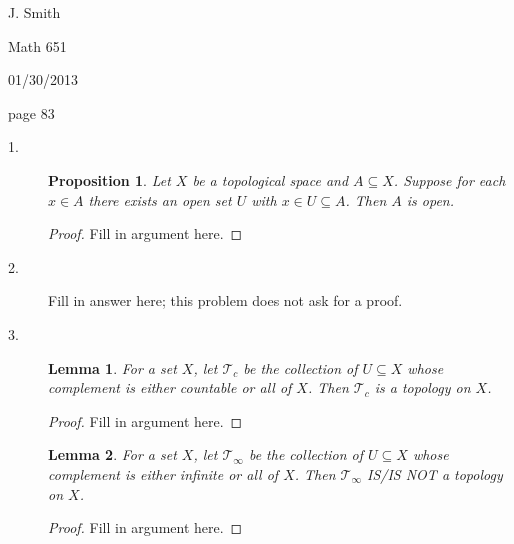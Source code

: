 \documentclass[10pt]{report}
\theoremstyle{plain}
\newtheorem*{lem}{Lemma}
\newtheorem*{prop}{Proposition}
\begin{document}
\hfill J. Smith

\hfill Math 651

\hfill 01/30/2013 %

\medskip
 
\doublespace%
  
\noindent
page 83
\begin{description}

\item[1.] 
\begin{prop} Let $X$ be a topological space and $A\subseteq X$. Suppose for each $x\in A$ there exists an open set $U$ with $x\in U\subseteq A$. Then $A$ is open.
\end{prop}
\begin{proof}
Fill in argument here.
\end{proof}

 \item[2.] 
Fill in answer here; this problem does not ask for a proof.

\item[3.] 
\begin{lem} For a set $X$, let $\mathcal T_c$ be the collection of $U\subseteq X$ whose complement is either countable or all of $X$.
Then $\mathcal T_c$ is a topology on $X$.
\end{lem}
\begin{proof}
Fill in argument here.
\end{proof}

\begin{lem} For a set $X$, let $\mathcal T_\infty$ be the collection of $U\subseteq X$ whose complement is either infinite or all of $X$.
Then $\mathcal T_\infty$ IS/IS NOT a topology on $X$.
\end{lem}
\begin{proof}
Fill in argument here.
\end{proof}

\end{description}
\end{document}
